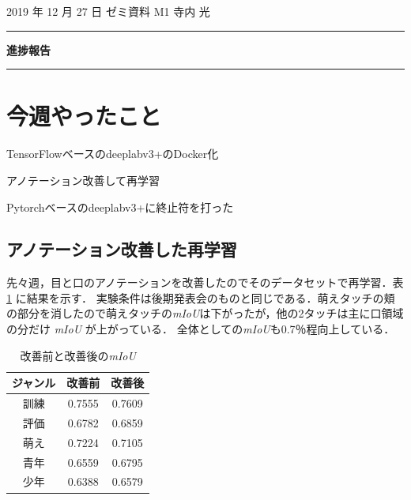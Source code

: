\documentclass[onecolumn]{ujarticle}   %
\begin{document}
	\noindent

	\hspace{1em}
	2019 年 12 月 27 日
	ゼミ資料
	\hfill
	M1 寺内 光

	\vspace{2mm}

	\hrule

	\begin{center}
		{\Large \bf 進捗報告}
	\end{center}


	\hrule
	\vspace{3mm}

	\section{今週やったこと}
	\begin{itemize}{
		\item{TensorFlowベースのdeeplabv3+のDocker化}
		\item{アノテーション改善して再学習}
		\item{Pytorchベースのdeeplabv3+に終止符を打った}
	}
	\end{itemize}

	\subsection{アノテーション改善した再学習}
	先々週，目と口のアノテーションを改善したのでそのデータセットで再学習．表 \ref{tab:touch_iou} に結果を示す．
	実験条件は後期発表会のものと同じである．萌えタッチの頬の部分を消したので萌えタッチの{\it mIoU}は下がったが，他の2タッチは主に口領域の分だけ {\it mIoU} が上がっている．
	全体としての{\it mIoU}も0.7％程向上している．

	\begin{table}[h]
		\centering
		\caption{改善前と改善後の{\it mIoU}}
		\label{tab:touch_iou}
		\begin{tabular}{|c||c|c|} \hline
			ジャンル&改善前&改善後\\ \hline
			訓練&0.7555&0.7609\\ \hline
			評価&0.6782&0.6859\\ \hline
			萌え&0.7224&0.7105\\ \hline
			青年&0.6559&0.6795\\ \hline
			少年&0.6388&0.6579\\ \hline
		\end{tabular}
	\end{table}
\end{document}
